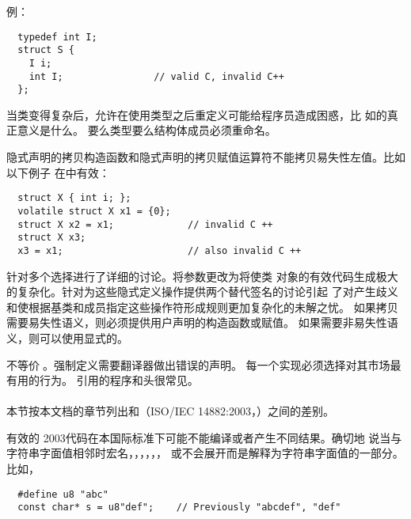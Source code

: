 例：
\begin{lstlisting}
  typedef int I;
  struct S {
    I i;
    int I;                // valid C, invalid C++
  };
\end{lstlisting}
\diffrat 当类变得复杂后，允许在使用类型之后重定义可能给\cpp{}程序员造成困惑，比
如的真正意义是什么。
\diffeff \semdel
\diffdiff \semtrans 要么类型要么结构体成员必须重命名。
\diffuse \seldom

隐式声明的拷贝构造函数和隐式声明的拷贝赋值运算符不能拷贝易失性左值。比如以下例子
在\isoc{}中有效：
\begin{lstlisting}
  struct X { int i; };
  volatile struct X x1 = {0};
  struct X x2 = x1;             // invalid C ++
  struct X x3;
  x3 = x1;                      // also invalid C ++
\end{lstlisting}
\diffrat 针对多个选择进行了详细的讨论。将参数更改为将使类
对象的有效代码生成极大的复杂化。针对为这些隐式定义操作提供两个替代签名的讨论引起
了对产生歧义和使根据基类和成员指定这些操作符形成规则更加复杂化的未解之忧。
\diffeff \semdel
\diffdiff \semtrans 如果拷贝需要易失性语义，则必须提供用户声明的构造函数或赋值。
如果需要非易失性语义，则可以使用显式的。
\diffuse \seldom

\diffrat \cpp{}不等价于\c{}。强制定义需要翻译器做出错误的声明。
每一个实现必须选择对其市场最有用的行为。
\diffeff \semchg
\diffdiff \semtrans
\diffuse 引用的程序和头很常见。

\paragraph{}
本节按本文档的章节列出\cpp{}和\isocppthr（ISO/IEC 14882:2003，）之间的差别。

\diffrat \featreq
\diffeff 有效的\cpp{} 2003代码在本国际标准下可能不能编译或者产生不同结果。确切地
说当与字符串字面值相邻时宏名，，，，，，
或不会展开而是解释为字符串字面值的一部分。比如，
\begin{lstlisting}
  #define u8 "abc"
  const char* s = u8"def";    // Previously "abcdef", "def"
\end{lstlisting}

